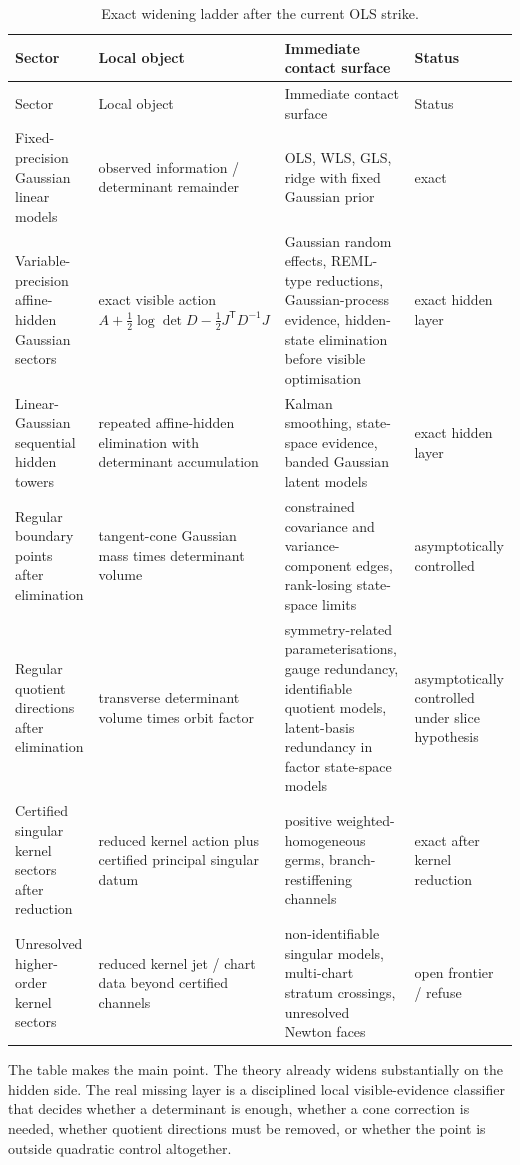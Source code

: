 \documentclass[11pt,a4paper]{article}
\numberwithin{equation}{section}
\theoremstyle{thmcompact}
\theoremstyle{remark}
\begin{document}
{\small
\begin{longtable}{@{}p{}p{}p{}p{}@{}}
\caption{Exact widening ladder after the current OLS strike.}\label{tab:ladder}\\
\toprule
Sector & Local object & Immediate contact surface & Status \\
\midrule
\endfirsthead
\toprule
Sector & Local object & Immediate contact surface & Status \\
\midrule
\endhead
Fixed-precision Gaussian linear models & observed information / determinant remainder & OLS, WLS, GLS, ridge with fixed Gaussian prior & exact \\
Variable-precision affine-hidden Gaussian sectors & exact visible action $A + \frac12\log\det D - \frac12 J^{\mathsf T}D^{-1}J$ & Gaussian random effects, REML-type reductions, Gaussian-process evidence, hidden-state elimination before visible optimisation & exact hidden layer \\
Linear-Gaussian sequential hidden towers & repeated affine-hidden elimination with determinant accumulation & Kalman smoothing, state-space evidence, banded Gaussian latent models & exact hidden layer \\
Regular boundary points after elimination & tangent-cone Gaussian mass times determinant volume & constrained covariance and variance-component edges, rank-losing state-space limits & asymptotically controlled \\
Regular quotient directions after elimination & transverse determinant volume times orbit factor & symmetry-related parameterisations, gauge redundancy, identifiable quotient models, latent-basis redundancy in factor state-space models & asymptotically controlled under slice hypothesis \\
Certified singular kernel sectors after reduction & reduced kernel action plus certified principal singular datum & positive weighted-homogeneous germs, branch-restiffening channels & exact after kernel reduction \\
Unresolved higher-order kernel sectors & reduced kernel jet / chart data beyond certified channels & non-identifiable singular models, multi-chart stratum crossings, unresolved Newton faces & open frontier / refuse \\
\bottomrule
\end{longtable}
}

The table makes the main point. The theory already widens substantially on the hidden side. The real missing layer is a disciplined local visible-evidence classifier that decides whether a determinant is enough, whether a cone correction is needed, whether quotient directions must be removed, or whether the point is outside quadratic control altogether.
\end{document}
